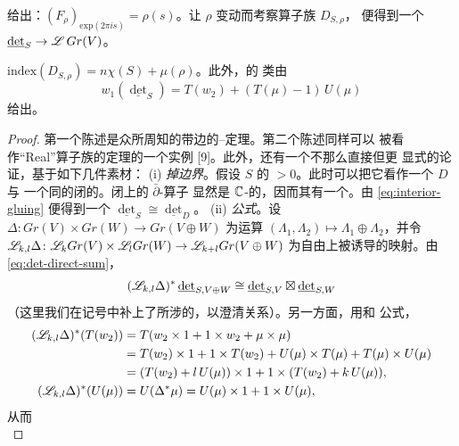 给出：$(F_\rho)_{\mathrm{exp}(2\pi is)}=\rho(s)$。让 $\rho$ 变动而考察算子族 $D_{S,\rho}$，
便得到一个\trDeterminantLine\trLineBundle{} $\underline{\det}_S\to\mathscr{L}\,Gr(V)$。
\begin{lemma}\label{thm:det-line-bundle-loop-space}
$\mathrm{index}(D_{S,\rho})=n\chi(S)+\mu(\rho)$。此外，\trDeterminantLine\trLineBundle{}的%
\trIsomorphism{}类由
\begin{equation}\label{eq:det-bundle-w1}
w_1(\underline{\det}_S)=T(w_2)+(T(\mu)-1)\,U(\mu)
\end{equation}
给出。
\end{lemma}
\begin{proof}
第一个陈述是众所周知的带边\trSurface{}的\trRiemann--\trRoch{}定理。第二个陈述同样可以
被看作“Real”算子族的\trIndex{}定理的一个实例 [9]。此外，还有一个不那么直接但更
显式的论证，基于如下几件素材：
(i) \emph{\trPinch{}掉边界}。假设 $S$ 的\trGenus{} $>0$。此时可以把它看作一个\trDisk{} $D$ 与
一个同\trGenus{}的闭\trRiemann\trSurface{}的\trConnectedSum。闭\trSurface{}上的 $\bar\partial$-算子
显然是 $\mathbb{C}$-\trLinear{}的，因而其\trDeterminantLine{}有一个\trCanonical{}\trTrivialization。由
\eqref{eq:interior-gluing} 便得到一个\trIsomorphism{}
$\underline{\det}_S\cong\underline{\det}_D$。
(ii) \emph{\trDirectSum{}公式}。设
$\Delta\colon Gr(V)\times Gr(W)\to Gr(V\oplus W)$ 为\trDirectSum{}运算
$(\Lambda_1,\Lambda_2)\mapsto\Lambda_1\oplus\Lambda_2$，并令
$\mathscr{L}_{k,l}\Delta\colon\mathscr{L}_kGr(V)\times\mathscr{L}_lGr(W)\to
\mathscr{L}_{k+l}Gr(V\oplus W)$ 为自由\trLoopSpace{}上被诱导的映射。由
\eqref{eq:det-direct-sum}，
\begin{equation*}
(\mathscr{L}_{k,l}\Delta)^*\,\underline{\det}_{S,V\oplus W}
\cong\underline{\det}_{S,V}\boxtimes\underline{\det}_{S,W}
\end{equation*}
（这里我们在记号中补上了所涉的\trVectorSpace，以澄清关系）。另一方面，用\trWhitney{}和
公式，
\begin{equation*}
\begin{aligned}
(\mathscr{L}_{k,l}\Delta)^*(T(w_2))&=T(w_2\times 1+1\times w_2+\mu\times\mu)\\
&=T(w_2)\times 1+1\times T(w_2)+U(\mu)\times T(\mu)+T(\mu)\times U(\mu)\\
&=(T(w_2)+l\,U(\mu))\times 1+1\times(T(w_2)+k\,U(\mu)),\\
(\mathscr{L}_{k,l}\Delta)^*(U(\mu))&=U(\Delta^*\mu)=U(\mu)\times 1+1\times U(\mu),
\end{aligned}
\end{equation*}
从而
\begin{equation*}

\end{equation*}
\end{proof}
